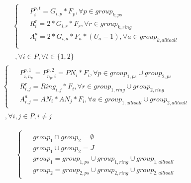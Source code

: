 \documentclass[conference]{IEEEtran}
\begin{document}
\begin{equation}
	\begin{split}
		\begin{cases}
			\begin{aligned}
				& P_{i}^{p,t} = G_{i,p} * F_{p}, \forall p\in group_{k,ps}\\
				& R_{i}^{r} = 2 * G_{i,r} * F_{r}, \forall r\in group_{k,ring}\\
				& A_{i}^{a} = 2 * G_{i,a} * F_{a} * (U_{a} - 1), \forall a\in group_{k,alltoall}\\
			\end{aligned}
		\end{cases}\\
		\begin{aligned}
			,\forall i\in P,\forall t\in\{1,2\}
		\end{aligned}
	\end{split}
\end{equation}
\begin{equation}
	\begin{split}
		\begin{cases}
			\begin{aligned}
				& P_{i,n_p}^{p,1} = P_{n_p,i}^{p,2} = PN_i * F_i, \forall p \in group_{1,ps}\cup group_{2,ps}\\
				& R_{i,j}^{r} = Ring_{i,j} * F_i, \forall r \in group_{1,ring}\cup group_{2,ring}\\
				& A_{i,j}^a = AN_i * AN_j * F_i, \forall a \in group_{1,alltoall}\cup group_{2,alltoall}
			\end{aligned}
		\end{cases}\\
		\begin{aligned}
			,\forall i,j\in P,i\neq j
		\end{aligned}
	\end{split}
\end{equation}

\begin{equation}
	\begin{cases}
		\begin{aligned}
			& group_1 \cap group_2 = \emptyset \\
			& group_1 \cup group_2 = J \\
			& group_1 = group_{1,ps} \cup group_{1,ring} \cup group_{1, alltoall}\\
			& group_2 = group_{2,ps} \cup group_{2,ring} \cup group_{2, alltoall}
		\end{aligned}
	\end{cases}
\end{equation}
\end{document}
